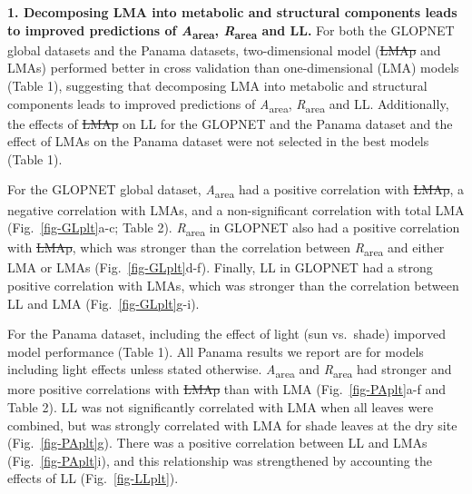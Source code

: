 \documentclass[
  12pt,
  a4paper,
,tablecaptionabove
]{scrartcl}
\providecommand{\DIFaddtex}[1]{{\protect\color{blue}\uwave{#1}}} %
\providecommand{\DIFdeltex}[1]{{\protect\color{red}\sout{#1}}}                      %
\providecommand{\DIFaddbegin}{} %
\providecommand{\DIFaddend}{} %
\providecommand{\DIFdelbegin}{} %
\providecommand{\DIFdelend}{} %
\providecommand{\DIFadd}[1]{\texorpdfstring{\DIFaddtex{#1}}{#1}} %
\providecommand{\DIFdel}[1]{\texorpdfstring{\DIFdeltex{#1}}{}} %
\newcommand{\DIFscaledelfig}{0.5}
\newlength{\DIFdelgraphicswidth} %
\newlength{\DIFdelgraphicsheight} %
\newcommand{\DIFaddincludegraphics}[2][]{{\color{blue}\fbox{\DIFOincludegraphics[#1]{#2}}}} %
\newcommand{\DIFdelincludegraphics}[2][]{%
\sbox{\DIFdelgraphicsbox}{\DIFOincludegraphics[#1]{#2}}%
\settoboxwidth{\DIFdelgraphicswidth}{\DIFdelgraphicsbox} %
\settoboxtotalheight{\DIFdelgraphicsheight}{\DIFdelgraphicsbox} %
\scalebox{\DIFscaledelfig}{%
\parbox[b]{\DIFdelgraphicswidth}{\usebox{\DIFdelgraphicsbox}\\[-\baselineskip] \rule{\DIFdelgraphicswidth}{0em}}\llap{\resizebox{\DIFdelgraphicswidth}{\DIFdelgraphicsheight}{%
\setlength{\unitlength}{\DIFdelgraphicswidth}%
\begin{picture}(1,1)%
\thicklines\linethickness{2pt} %
{\color[rgb]{1,0,0}\put(0,0){\framebox(1,1){}}}%
{\color[rgb]{1,0,0}\put(0,0){\line( 1,1){1}}}%
{\color[rgb]{1,0,0}\put(0,1){\line(1,-1){1}}}%
\end{picture}%
}\hspace*{3pt}}} %
} %
\DeclareRobustCommand{\DIFaddbegin}{\DIFOaddbegin \let\includegraphics\DIFaddincludegraphics} %
\DeclareRobustCommand{\DIFaddend}{\DIFOaddend \let\includegraphics\DIFOincludegraphics} %
\DeclareRobustCommand{\DIFdelbegin}{\DIFOdelbegin \let\includegraphics\DIFdelincludegraphics} %
\DeclareRobustCommand{\DIFdelend}{\DIFOaddend \let\includegraphics\DIFOincludegraphics} %
\begin{document}
\textbf{1. Decomposing LMA into metabolic and structural components
leads to improved predictions of \emph{A}\textsubscript{area},
\emph{R}\textsubscript{area} and LL.} For both the GLOPNET global
datasets and the Panama datasets, two-dimensional model (\DIFdelbegin \DIFdel{LMAp }\DIFdelend \DIFaddbegin \DIFadd{LMAm }\DIFaddend and LMAs)
performed better in cross validation than one-dimensional (LMA) models
(Table 1), suggesting that decomposing LMA into metabolic and structural
components leads to improved predictions of
\emph{A}\textsubscript{area}, \emph{R}\textsubscript{area} and LL.
Additionally, the effects of \DIFdelbegin \DIFdel{LMAp }\DIFdelend \DIFaddbegin \DIFadd{LMAm }\DIFaddend on LL for the GLOPNET and the Panama
dataset and the effect of LMAs on the Panama dataset were not selected
in the best models (Table 1).

For the GLOPNET global dataset, \emph{A}\textsubscript{area} had a
positive correlation with \DIFdelbegin \DIFdel{LMAp}\DIFdelend \DIFaddbegin \DIFadd{LMAm}\DIFaddend , a negative correlation with LMAs, and a
non-significant correlation with total LMA (Fig.~\ref{fig-GLplt}a-c;
Table 2). \emph{R}\textsubscript{area} in GLOPNET also had a positive
correlation with \DIFdelbegin \DIFdel{LMAp}\DIFdelend \DIFaddbegin \DIFadd{LMAm}\DIFaddend , which was stronger than the correlation between
\emph{R}\textsubscript{area} and either LMA or LMAs
(Fig.~\ref{fig-GLplt}d-f). Finally, LL in GLOPNET had a strong positive
correlation with LMAs, which was stronger than the correlation between
LL and LMA (Fig.~\ref{fig-GLplt}g-i).

For the Panama dataset, including the effect of light (sun vs.~shade)
imporved model performance (Table 1). All Panama results we report are
for models including light effects unless stated otherwise.
\emph{A}\textsubscript{area} and \emph{R}\textsubscript{area} had
stronger and more positive correlations with \DIFdelbegin \DIFdel{LMAp }\DIFdelend \DIFaddbegin \DIFadd{LMAm }\DIFaddend than with LMA
(Fig.~\ref{fig-PAplt}a-f and Table 2). LL was not significantly
correlated with LMA when all leaves were combined, but was strongly
correlated with LMA for shade leaves at the dry site
(Fig.~\ref{fig-PAplt}g). There was a positive correlation between LL and
LMAs (Fig.~\ref{fig-PAplt}i), and this relationship was strengthened by
accounting the effects of LL (Fig.~\ref{fig-LLplt}).
\end{document}
